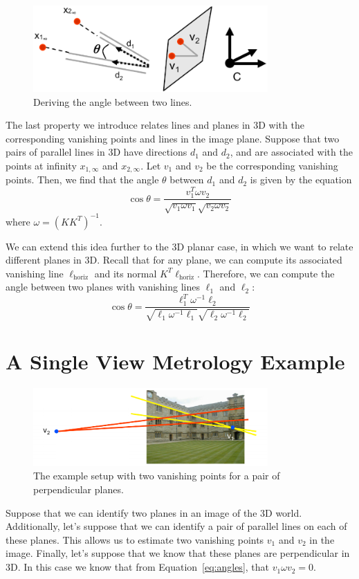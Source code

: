 \documentclass[a4paper, 12pt]{article}
\begin{document}
\begin{figure}[h!]
\centering
\includegraphics[width=0.8\textwidth]{figures/angles.png}
\caption{Deriving the angle between two lines.}
\label{fig:angles}
\end{figure}

The last property we introduce relates lines and planes in 3D with the corresponding vanishing points and lines in the image plane. Suppose that two pairs of parallel lines in 3D have directions $d_1$ and $d_2$, and are associated with the points at infinity $x_{1,\infty}$ and $x_{2,\infty}$. Let $v_1$ and $v_2$ be the corresponding vanishing points. Then, we find that the angle $\theta$ between $d_1$ and $d_2$ is given by the equation
\begin{equation}
\cos\theta = \frac{v_1^T\omega v_2}{\sqrt{v_1 \omega v_1}\sqrt{v_2 \omega v_2}}
\label{eq:angles}
\end{equation}
where $\omega = (KK^T)^{-1}$. 

We can extend this idea further to the 3D planar case, in which we want to relate different planes in 3D. Recall that for any plane, we can compute its associated vanishing line $\ell_\mathrm{{horiz}}$ and its normal $K^T \ell_{\mathrm{horiz}}$. Therefore, we can compute the angle between two planes with vanishing lines $\ell_1$ and $\ell_2$:
\begin{equation}
    \cos\theta = \frac{\ell_1^T\omega^{-1} \ell_2}{\sqrt{\ell_1 \omega^{-1} \ell_1}\sqrt{\ell_2 \omega^{-1} \ell_2}}
\end{equation}

\section{A Single View Metrology Example}
\begin{figure}[h!]
\centering
\includegraphics[width=0.8\textwidth]{figures/example1.png}
\caption{The example setup with two vanishing points for a pair of perpendicular planes.}
\label{fig:example1}
\end{figure}
Suppose that we can identify two planes in an image of the 3D world. Additionally, let's suppose that we can identify a pair of parallel lines on each of these planes. This allows us to estimate two vanishing points $v_1$ and $v_2$ in the image. Finally, let's suppose that we know that these planes are perpendicular in 3D. In this case we know that from Equation~\ref{eq:angles}, that $v_1\omega v_2 = 0$. 
\end{document}
